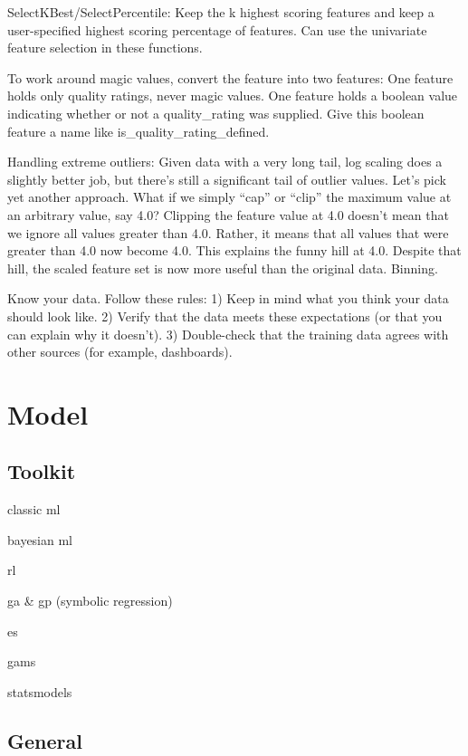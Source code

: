 \documentclass[]{book}
\begin{document}
SelectKBest/SelectPercentile: Keep the k highest scoring features and keep a user-specified highest scoring percentage of features. Can use the univariate feature selection in these functions.

To work around magic values, convert the feature into two features: One feature holds only quality ratings, never magic values. One feature holds a boolean value indicating whether or not a quality\_rating was supplied. Give this boolean feature a name like is\_quality\_rating\_defined.

Handling extreme outliers: Given data with a very long tail, log scaling does a slightly better job, but there's still a significant tail of outlier values. Let's pick yet another approach. What if we simply ``cap'' or ``clip'' the maximum value at an arbitrary value, say 4.0? Clipping the feature value at 4.0 doesn't mean that we ignore all values greater than 4.0. Rather, it means that all values that were greater than 4.0 now become 4.0. This explains the funny hill at 4.0. Despite that hill, the scaled feature set is now more useful than the original data. Binning.

Know your data. Follow these rules: 1) Keep in mind what you think your data should look like. 2) Verify that the data meets these expectations (or that you can explain why it doesn't). 3) Double-check that the training data agrees with other sources (for example, dashboards).

\hypertarget{model-1}{%
\chapter{Model}\label{model-1}}

\hypertarget{toolkit}{%
\section{Toolkit}\label{toolkit}}

classic ml

bayesian ml

rl

ga \& gp (symbolic regression)

es

gams

statsmodels

\hypertarget{general-2}{%
\section{General}\label{general-2}}
\end{document}
